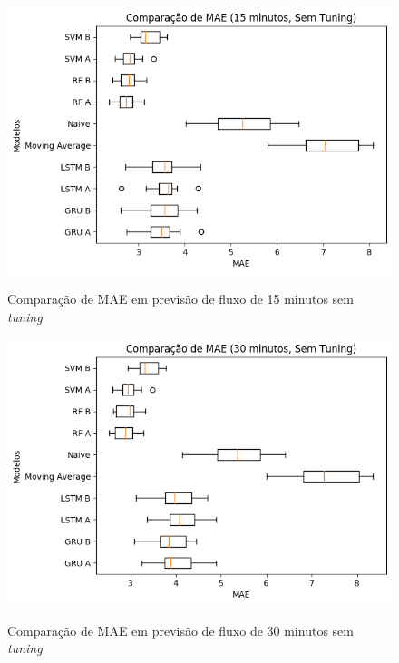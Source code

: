 \begin{figure}[htbp]
    \centering
    \includegraphics[scale=0.8]{monography/img/snapshots/comparacao_de_mae_(15_minutos,_sem_tuning)_performance_boxes.png}
    \label{figure:comparacao_previsao_mae_15_sem_tuning}
    \caption{Comparação de MAE em previsão de fluxo de 15 minutos sem \textit{tuning}}
\end{figure}

\begin{figure}[htbp]
    \centering
    \includegraphics[scale=0.8]{monography/img/snapshots/comparacao_de_mae_(30_minutos,_sem_tuning)_performance_boxes.png}
    \label{figure:comparacao_previsao_mae_30_sem_tuning}
    \caption{Comparação de MAE em previsão de fluxo de 30 minutos sem \textit{tuning}}
\end{figure}

